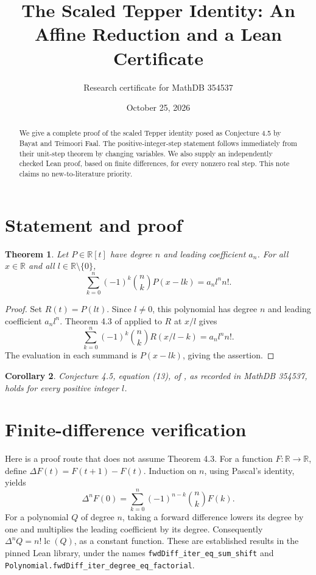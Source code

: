 \documentclass[11pt]{article}
\title{The Scaled Tepper Identity: An Affine Reduction and a Lean Certificate}
\author{Research certificate for MathDB 354537}
\date{October 25, 2026}
\newtheorem{theorem}{Theorem}
\newtheorem{corollary}[theorem]{Corollary}
\begin{document}
\maketitle
\begin{abstract}
We give a complete proof of the scaled Tepper identity posed as Conjecture 4.5 by Bayat and Teimoori Faal. The positive-integer-step statement follows immediately from their unit-step theorem by changing variables. We also supply an independently checked Lean proof, based on finite differences, for every nonzero real step. This note claims no new-to-literature priority.
\end{abstract}
\section{Statement and proof}
\begin{theorem}\label{thm:main}
Let $P\in\mathbb R[t]$ have degree $n$ and leading coefficient $a_n$. For all $x\in\mathbb R$ and all $l\in\mathbb R\setminus\{0\}$,
\[
\sum_{k=0}^n(-1)^k\binom nkP(x-lk)=a_n l^n n!.
\]
\end{theorem}
\begin{proof}
Set $R(t)=P(lt)$. Since $l\ne0$, this polynomial has degree $n$ and leading coefficient $a_nl^n$. Theorem 4.3 of \cite{BT} applied to $R$ at $x/l$ gives
\[
\sum_{k=0}^n(-1)^k\binom nkR(x/l-k)=a_nl^nn!.
\]
The evaluation in each summand is $P(x-lk)$, giving the assertion.
\end{proof}
\begin{corollary}
Conjecture 4.5, equation (13), of \cite{BT}, as recorded in MathDB 354537, holds for every positive integer $l$.
\end{corollary}
\section{Finite-difference verification}
Here is a proof route that does not assume Theorem 4.3. For a function $F:\mathbb R\to\mathbb R$, define $\Delta F(t)=F(t+1)-F(t)$. Induction on $n$, using Pascal's identity, yields
\[
\Delta^nF(0)=\sum_{k=0}^n(-1)^{n-k}\binom nk F(k).
\]
For a polynomial $Q$ of degree $n$, taking a forward difference lowers its degree by one and multiplies the leading coefficient by its degree. Consequently $\Delta^nQ=n!\operatorname{lc}(Q)$, as a constant function. These are established results in the pinned Lean library, under the names \texttt{fwdDiff\_iter\_eq\_sum\_shift} and \texttt{Polynomial.fwdDiff\_iter\_degree\_eq\_factorial}.
\end{document}
